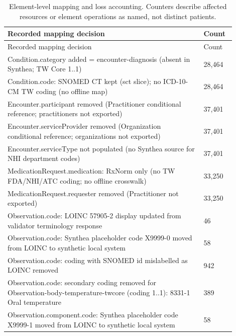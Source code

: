 {\small\setlength{\tabcolsep}{3pt}
\begin{longtable}{p{0.78\linewidth}p{0.12\linewidth}}
\caption{Element-level mapping and loss accounting. Counters describe affected resources or element operations as named, not distinct patients.}\label{sup:mappingloss}\\
\hline
Recorded mapping decision & Count \\ \hline
\endfirsthead
\hline
Recorded mapping decision & Count \\ \hline
\endhead
Condition.\allowbreak{}category added = encounter-\allowbreak{}diagnosis (absent in Synthea; TW Core 1.\allowbreak{}.\allowbreak{}1) & 28,464 \\
Condition.\allowbreak{}code:\allowbreak{} SNOMED CT kept (sct slice); no ICD-\allowbreak{}10-\allowbreak{}CM TW coding (no offline map) & 28,464 \\
Encounter.\allowbreak{}participant removed (Practitioner conditional reference; practitioners not exported) & 37,401 \\
Encounter.\allowbreak{}serviceProvider removed (Organization conditional reference; organizations not exported) & 37,401 \\
Encounter.\allowbreak{}serviceType not populated (no Synthea source for NHI department codes) & 37,401 \\
MedicationRequest.\allowbreak{}medication:\allowbreak{} RxNorm only (no TW FDA/\allowbreak{}NHI/\allowbreak{}ATC coding; no offline crosswalk) & 33,250 \\
MedicationRequest.\allowbreak{}requester removed (Practitioner not exported) & 33,250 \\
Observation.\allowbreak{}code:\allowbreak{} LOINC 57905-\allowbreak{}2 display updated from validator terminology response & 46 \\
Observation.\allowbreak{}code:\allowbreak{} Synthea placeholder code X9999-\allowbreak{}0 moved from LOINC to synthetic local system & 58 \\
Observation.\allowbreak{}code:\allowbreak{} coding with SNOMED id mislabelled as LOINC removed & 942 \\
Observation.\allowbreak{}code:\allowbreak{} secondary coding removed for Observation-\allowbreak{}body-\allowbreak{}temperature-\allowbreak{}twcore (coding 1.\allowbreak{}.\allowbreak{}1):\allowbreak{} 8331-\allowbreak{}1 Oral temperature & 389 \\
Observation.\allowbreak{}component.\allowbreak{}code:\allowbreak{} Synthea placeholder code X9999-\allowbreak{}1 moved from LOINC to synthetic local system & 58 \\

\end{longtable}}
